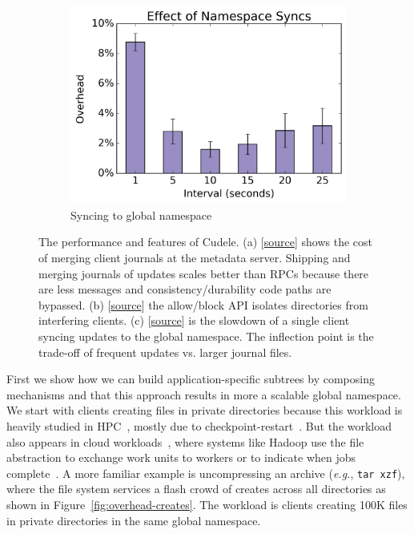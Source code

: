 \begin{figure}[t]
\begin{subfigure}[b]{.3\linewidth}
      \centering
      \includegraphics[width=1.0\linewidth]{graphs/slowdown-sync.png}
      \caption{Syncing to global namespace}
      \label{fig:slowdown-sync}
  \end{subfigure}
\caption{ The performance and features of Cudele. (a)
[\href{https://github.com/michaelsevilla/cudele-popper/blob/revision/experiments/cudele-mergescale/visualize/viz.ipynb}{source}]
shows the cost of merging client journals at the metadata server. Shipping and
merging journals of updates scales better than RPCs because there are less
messages and consistency/durability code paths are bypassed. (b)
[\href{https://github.com/michaelsevilla/cudele-popper/blob/revision/experiments/cudele-blockapi/visualize/viz.ipynb}{source}]
the allow/block API isolates directories from interfering clients. (c)
[\href{https://github.com/michaelsevilla/cudele-popper/blob/revision/experiments/cudele-partialreads/visualize/viz.ipynb}{source}]
is the slowdown of a single client syncing updates to the global namespace. The
inflection point is the trade-off of frequent updates vs. larger journal
files.} \label{fig:use-cases}
\end{figure}


First we show how we can build application-specific subtrees by composing
mechanisms and that this approach results in more a scalable global namespace.
We start with clients creating files in private directories because this
workload is heavily studied in HPC~\cite{weil:sc2004-dyn-metadata,
ren:sc2014-indexfs, patil:fast2011-giga, zheng:pdsw2014-batchfs,
sevilla:sc15-mantle}, mostly due to checkpoint-restart~\cite{bent_plfs_2009}.
But the workload also appears in cloud workloads~\cite{xiao:socc15-shardfs},
where systems like Hadoop use the file abstraction to exchange work units to
workers or to indicate when jobs
complete~\cite{shvachko:login2012-hdfs-scalability}. A more familiar example is
uncompressing an archive ({\it e.g.}, \texttt{tar xzf}), where the file system
services a flash crowd of creates across all directories as shown in
Figure~\ref{fig:overhead-creates}.  The workload is clients creating 100K files
in private directories in the same global namespace.

